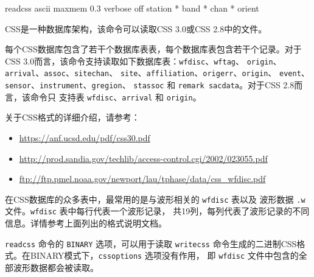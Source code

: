 \begin{SACSTX}
readcss ascii maxmem 0.3 verbose off station * band * chan * orient
\end{SACSTX}

CSS是一种数据库架构，该命令可以读取CSS 3.0或CSS 2.8中的文件。

每个CSS数据库包含了若干个数据库表表，每个数据库表包含若干个记录。对于
CSS 3.0而言，该命令支持读取如下数据库表：\texttt{wfdisc}、\texttt{wftag}、
\texttt{origin}、\texttt{arrival}、\texttt{assoc}、\texttt{sitechan}、
\texttt{site}、\texttt{affiliation}、\texttt{origerr}、\texttt{origin}、
\texttt{event}、\texttt{sensor}、\texttt{instrument}、\texttt{gregion}、
\texttt{stassoc} 和 \texttt{remark sacdata}。对于CSS 2.8而言，该命令只
支持表 \texttt{wfdisc}、\texttt{arrival} 和 \texttt{origin}。

关于CSS格式的详细介绍，请参考：
\begin{itemize}
\item \url{https://anf.ucsd.edu/pdf/css30.pdf}
\item \url{http://prod.sandia.gov/techlib/access-control.cgi/2002/023055.pdf}
\item \url{ftp://ftp.pmel.noaa.gov/newport/lau/tphase/data/css_wfdisc.pdf}
\end{itemize}

在CSS数据库的众多表中，最常用的是与波形相关的 \texttt{wfdisc} 表以及
波形数据 \texttt{.w} 文件。\texttt{wfdisc} 表中每行代表一个波形记录，
共19列，每列代表了波形记录的不同信息。详情参考上面列出的格式说明文档。

\texttt{readcss} 命令的 \texttt{BINARY} 选项，可以用于读取 \texttt{writecss}
命令生成的二进制CSS格式。在BINARY模式下，\texttt{cssoptions} 选项没有作用，
即 \texttt{wfdisc} 文件中包含的全部波形数据都会被读取。
